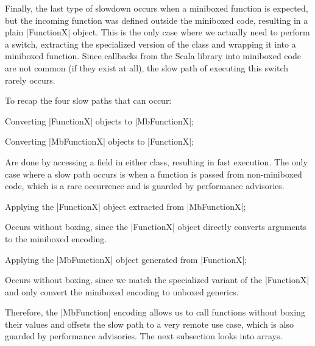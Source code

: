 Finally, the last type of slowdown occurs when a miniboxed function is expected, but the incoming function was defined outside the miniboxed code, resulting in a plain |FunctionX| object. This is the only case where we actually need to perform a switch, extracting the specialized version of the class and wrapping it into a miniboxed function. Since callbacks from the Scala library into miniboxed code are not common (if they exist at all), the slow path of executing this switch rarely occurs.

To recap the four slow paths that can occur:

\begin{compactitem}
  \item Converting |FunctionX| objects to |MbFunctionX|;
  \item Converting |MbFunctionX| objects to |FunctionX|;
  \begin{compactitem}
    \item Are done by accessing a field in either class, resulting in fast execution. The only case where a slow path occurs is when a function is passed from non-miniboxed code, which is a rare occurrence and is guarded by performance advisories.
  \end{compactitem}
  \item Applying the |FunctionX| object extracted from |MbFunctionX|;
  \begin{compactitem}
    \item Occurs without boxing, since the |FunctionX| object directly converts arguments to the miniboxed encoding.
  \end{compactitem}
  \item Applying the |MbFunctionX| object generated from |FunctionX|;
  \begin{compactitem}
    \item Occurs without boxing, since we match the specialized variant of the |FunctionX| and only convert the miniboxed encoding to unboxed generics.
  \end{compactitem}
\end{compactitem}

Therefore, the |MbFunction| encoding allows us to call functions without boxing their values and offsets the slow path to a very remote use case, which is also guarded by performance advisories. The next subsection looks into arrays.

